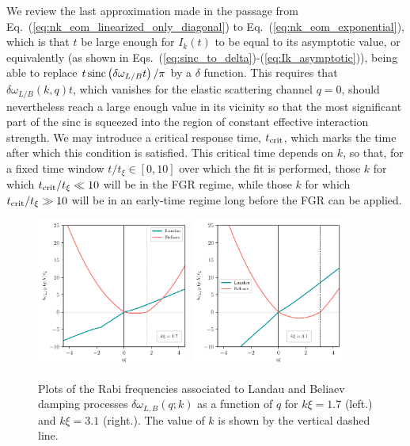 \documentclass[aps,prd,notitlepage,amsfonts,amssymb,amsmath,nofootinbib,superscriptaddress,longbibliography]{revtex4-2}
\begin{document}
\begin{appendices}
We review the last approximation made in the passage from Eq.~(\ref{eq:nk_eom_linearized_only_diagonal}) to Eq.~(\ref{eq:nk_eom_exponential}), which is that $t$ be large enough for $I_k(t)$ to be equal to its asymptotic value, or equivalently (as shown in Eqs.~(\ref{eq:sinc_to_delta})-(\ref{eq:Ik_asymptotic})), being able to replace $t \, {\rm sinc}\left(\delta\omega_{L/B}t\right)/\pi$ by a $\delta$ function.
This requires that $\delta\omega_{L/B} \left( k, q \right) t$, which vanishes for the elastic scattering channel $q = 0$, should nevertheless reach a large enough value in its vicinity so that the most significant part of the sinc is squeezed into the region of constant effective interaction strength. 
We may introduce a critical response time, $t_{\rm crit}$, which marks the time after which this condition is satisfied.  This critical time depends on $k$, so that, for a fixed time window $t/ t_{\xi} \in \left[ 0, 10 \right] $ over which the fit is performed, those $k$ for which $t_{\rm crit}/t_{\xi} \ll 10$ will be in the FGR regime, while those $k$ for which $t_{\rm crit}/t_{\xi} \gg 10$ will be in an early-time regime long before the FGR can be applied.


\begin{figure}
\centering
\includegraphics[width=0.45\textwidth]{fig8a.pdf}
\includegraphics[width=0.45\textwidth]{fig8b.pdf}
\caption{Plots of the Rabi frequencies associated to Landau and Beliaev damping  processes $\delta \omega_{L,B} \left( q ; k \right)$ as a function of $q$ for $k \xi = 1.7$ (left.) and $k \xi = 3.1$ (right.). The value of $k$ is shown by the vertical dashed line.}
\label{fig:rabi_frequencies} 
\end{figure}



\end{appendices}
\end{document}
